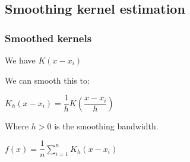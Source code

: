 
\subsection{Smoothing kernel estimation}

\subsubsection{Smoothed kernels}

We have \(K(x-x_i)\)

We can smooth this to:

\(K_h(x-x_i)=\dfrac{1}{h}K(\dfrac{x-x_i}{h})\)

Where \(h>0\) is the smoothing bandwidth.

\(f(x)=\dfrac{1}{n}\sum_{i=1}^nK_h(x-x_i)\)

